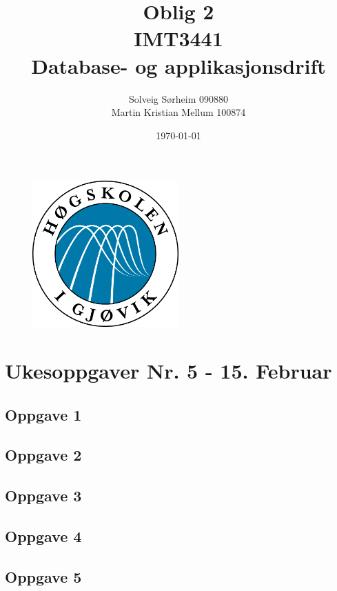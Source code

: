 \documentclass[a4paper, norsk, 12pt]{article}
\title{Oblig 2 \\ IMT3441 \\ Database- og applikasjonsdrift}
\author{Solveig Sørheim 090880 \\ Martin Kristian Mellum 100874}
\date{\today}
\begin{document}
\begin{figure}[h!]
 \centering
  \includegraphics[width=0.5\textwidth]{Images/hig_logo.png}
 \maketitle       %
\end{figure}
\pagebreak
\tableofcontents %
\pagebreak	%


\section{Ukesoppgaver Nr. 5 - 15. Februar}
\subsection{Oppgave 1}
\subsection{Oppgave 2}
\subsection{Oppgave 3}
\subsection{Oppgave 4}
\subsection{Oppgave 5}
\end{document}
